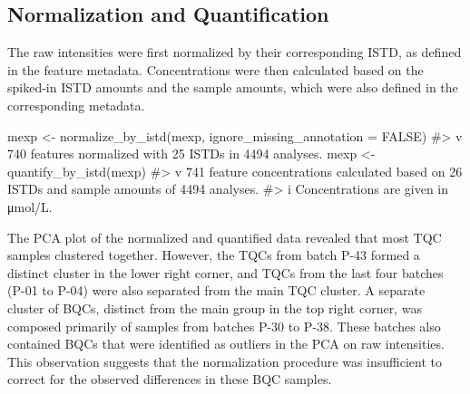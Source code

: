 \documentclass[
  letterpaper,
  DIV=11,
  numbers=noendperiod]{scrartcl}
\newenvironment{Shaded}{\begin{snugshade}}{\end{snugshade}}
\newcommand{\AttributeTok}[1]{\textcolor[rgb]{0.40,0.45,0.13}{#1}}
\newcommand{\CommentTok}[1]{\textcolor[rgb]{0.37,0.37,0.37}{#1}}
\newcommand{\ConstantTok}[1]{\textcolor[rgb]{0.56,0.35,0.01}{#1}}
\newcommand{\FunctionTok}[1]{\textcolor[rgb]{0.28,0.35,0.67}{#1}}
\newcommand{\NormalTok}[1]{\textcolor[rgb]{0.00,0.23,0.31}{#1}}
\newcommand{\OtherTok}[1]{\textcolor[rgb]{0.00,0.23,0.31}{#1}}
\begin{document}
\subsection{Normalization and
Quantification}\label{normalization-and-quantification}

The raw intensities were first normalized by their corresponding ISTD,
as defined in the feature metadata. Concentrations were then calculated
based on the spiked-in ISTD amounts and the sample amounts, which were
also defined in the corresponding metadata.

\begin{Shaded}
\begin{Highlighting}[]
\NormalTok{mexp }\OtherTok{\textless{}{-}} \FunctionTok{normalize\_by\_istd}\NormalTok{(mexp, }\AttributeTok{ignore\_missing\_annotation =} \ConstantTok{FALSE}\NormalTok{) }
\CommentTok{\#\textgreater{} v 740 features normalized with 25 ISTDs in 4494 analyses.}
\NormalTok{mexp }\OtherTok{\textless{}{-}} \FunctionTok{quantify\_by\_istd}\NormalTok{(mexp) }
\CommentTok{\#\textgreater{} v 741 feature concentrations calculated based on 26 ISTDs and sample amounts of 4494 analyses.}
\CommentTok{\#\textgreater{} i Concentrations are given in μmol/L.}
\end{Highlighting}
\end{Shaded}

The PCA plot of the normalized and quantified data revealed that most
TQC samples clustered together. However, the TQCs from batch P-43 formed
a distinct cluster in the lower right corner, and TQCs from the last
four batches (P-01 to P-04) were also separated from the main TQC
cluster. A separate cluster of BQCs, distinct from the main group in the
top right corner, was composed primarily of samples from batches P-30 to
P-38. These batches also contained BQCs that were identified as outliers
in the PCA on raw intensities. This observation suggests that the
normalization procedure was insufficient to correct for the observed
differences in these BQC samples.
\end{document}
